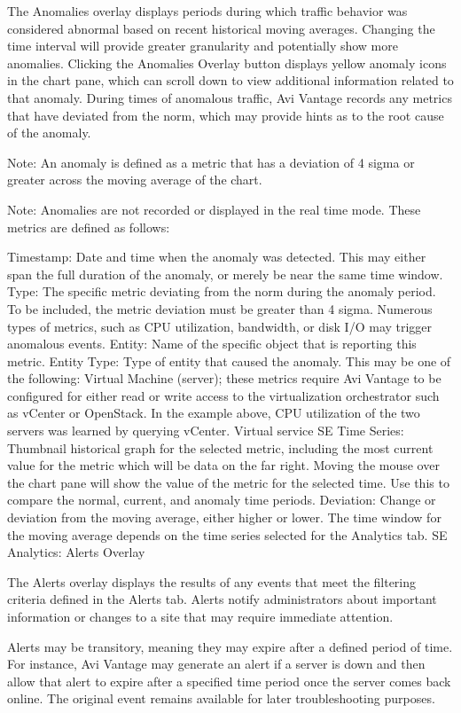 \documentclass[letterpaper,10pt,english]{sphinxmanual}
\begin{document}
The Anomalies overlay displays periods during which traffic behavior was considered abnormal based on recent historical moving averages. Changing the time interval will provide greater granularity and potentially show more anomalies. Clicking the Anomalies Overlay button displays yellow anomaly icons in the chart pane, which can scroll down to view additional information related to that anomaly. During times of anomalous traffic, Avi Vantage records any metrics that have deviated from the norm, which may provide hints as to the root cause of the anomaly.

Note: An anomaly is defined as a metric that has a deviation of 4 sigma or greater across the moving average of the chart.

Note: Anomalies are not recorded or displayed in the real time mode.
These metrics are defined as follows:

Timestamp: Date and time when the anomaly was detected. This may either span the full duration of the anomaly, or merely be near the same time window.
Type: The specific metric deviating from the norm during the anomaly period. To be included, the metric deviation must be greater than 4 sigma. Numerous types of metrics, such as CPU utilization, bandwidth, or disk I/O may trigger anomalous events.
Entity: Name of the specific object that is reporting this metric.
Entity Type: Type of entity that caused the anomaly. This may be one of the following:
Virtual Machine (server); these metrics require Avi Vantage to be configured for either read or write access to the virtualization orchestrator such as vCenter or OpenStack. In the example above, CPU utilization of the two servers was learned by querying vCenter.
Virtual service
SE
Time Series: Thumbnail historical graph for the selected metric, including the most current value for the metric which will be data on the far right. Moving the mouse over the chart pane will show the value of the metric for the selected time. Use this to compare the normal, current, and anomaly time periods.
Deviation: Change or deviation from the moving average, either higher or lower. The time window for the moving average depends on the time series selected for the Analytics tab.
SE Analytics: Alerts Overlay

The Alerts overlay displays the results of any events that meet the filtering criteria defined in the Alerts tab. Alerts notify administrators about important information or changes to a site that may require immediate attention.

Alerts may be transitory, meaning they may expire after a defined period of time. For instance, Avi Vantage may generate an alert if a server is down and then allow that alert to expire after a specified time period once the server comes back online. The original event remains available for later troubleshooting purposes.
\end{document}
